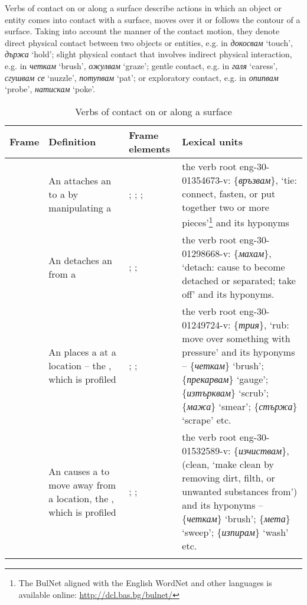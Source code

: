 \documentclass[output=paper,colorlinks,citecolor=brown]{langscibook}
\begin{document}
 \label{4.3.1.1} 
Verbs of contact on or along a surface describe actions in which an object or entity comes into contact with a surface, moves over it or follows the contour of a surface. Taking into account the manner of the contact motion, they denote direct physical contact between two objects or entities, e.g. in \textit{докосвам} `touch’, \textit{държа} `hold’; slight physical contact that involves indirect physical interaction,  e.g. in \textit{чет\-кам} `brush’, \textit{ожулвам} `graze’; gentle contact, e.g. in  \textit{галя} `caress’, \textit{сгушвам се} `nuzzle’, \textit{потупвам} `pat’; or exploratory contact,  e.g. in \textit{опипвам} `probe’, \textit{натис\-кам} `poke’.

\begin{table}
\small
\begin{tabularx}{\textwidth}{ lQQQ }
\lsptoprule
Frame & Definition & Frame elements & Lexical units \\
\midrule
{} & An  attaches an  to a  by manipulating a  & ; ; ;  & the verb root eng-30-01354673-v: \{\textit{връзвам}\}, `tie: connect, fasten, or put together two or more pieces’\footnote{The BulNet aligned with the English WordNet and other languages is available online: \url{http://dcl.bas.bg/bulnet/}} and its hyponyms \\
\midrule
{} & An  detaches an  from a  & ; ;  & the verb root eng-30-01298668-v: \{\textit{махам}\}, `detach: cause to become detached or separated; take off’ and its hyponyms. \\
\midrule
{} & An  places a  at a location -- the , which is profiled & ; ;  & the verb root eng-30-01249724-v: \{\textit{трия}\}, `rub:  move over something with pressure’ and its hyponyms -- \{\textit{четкам}\} `brush’; \{\textit{прекарвам}\} `gauge’; \{\textit{изтърквам}\} `scrub’; \{\textit{мажа}\} `smear’; \{\textit{стържа}\} `scrape’ etc. \\
\midrule
{} & An  causes a  to move away from a location, the , which is profiled & ; ;  & the verb root eng-30-01532589-v: \{\textit{изчиствам}\}, (clean, `make clean by removing dirt, filth, or unwanted substances from’) and its hyponyms -- \{\textit{четкам}\} `brush’; \{\textit{мета}\} `sweep’; \{\textit{изпирам}\} `wash’ etc. \\
\lspbottomrule
\end{tabularx}
\caption{Verbs of contact on or along a surface}
\label{tab:chapter5handle:keytotable1}
\end{table}
\end{document}
